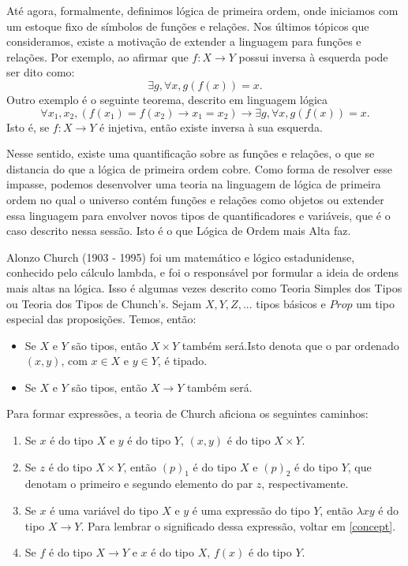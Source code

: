 Até agora, formalmente, definimos lógica de primeira ordem, onde iniciamos com
um estoque fixo de símbolos de funções e relações. Nos últimos tópicos que
consideramos, existe a motivação de extender a linguagem para funções e
relações. Por exemplo, ao afirmar que $f: X \to Y$ possui inversa à esquerda
pode ser dito como: $$\exists g, \forall x, g(f(x)) = x.$$ Outro exemplo é o
seguinte teorema, descrito em linguagem lógica 
$$\forall x_1, x_2, (f(x_1) = f(x_2) \to x_1 = x_2) \to \exists g, \forall x,
g(f(x)) = x.$$ Isto é, se $f: X \to Y$ é injetiva, então existe inversa à sua
esquerda.

Nesse sentido, existe uma quantificação sobre as funções e relações, o que se
distancia do que a lógica de primeira ordem cobre. Como forma de resolver esse
impasse, podemos desenvolver uma teoria na linguagem de lógica de primeira
ordem no qual o universo contém funções e relações como objetos ou extender
essa linguagem para envolver novos tipos de quantificadores e variáveis, que é
o caso descrito nessa sessão. Isto é o que Lógica de Ordem mais Alta faz. 

Alonzo Church (1903 - 1995) foi um matemático e lógico estadunidense,
conhecido pelo cálculo lambda, e foi o responsável por formular a ideia de
ordens  mais altas na lógica. Isso é algumas vezes descrito como Teoria
Simples dos Tipos ou Teoria dos Tipos de Chunch's. Sejam $X, Y, Z,...$ tipos
básicos e $Prop$ um tipo especial das proposições. Temos, então:
\begin{itemize}
    \item Se $X$ e $Y$ são tipos, então $X \times Y$ também será.Isto denota
    que o par ordenado $(x,y)$, com $x \in X$ e $y \in Y$, é tipado. 
    \item Se $X$ e $Y$ são tipos, então $X \to Y$ também será.
\end{itemize}

Para formar expressões, a teoria de Church aficiona os seguintes caminhos: 
\begin{enumerate}
    \item Se $x$ é do tipo $X$ e $y$ é do tipo $Y$, $(x,y)$ é do tipo $X
    \times Y$. 
    \item Se $z$ é do tipo $X \times Y$, então $(p)_1$ é do tipo $X$ e $(p)_2$
    é do tipo $Y$, que denotam o primeiro e segundo elemento do par $z$,
    respectivamente. 
    \item Se $x$ é uma variável do tipo $X$ e $y$ é uma expressão do tipo $Y$,
    então $\lambda x y$ é do tipo $X \to Y$. Para lembrar o significado dessa
    expressão, voltar em \ref{concept}.
    \item Se $f$ é do tipo $X \to Y$ e $x$ é do tipo $X$, $f(x)$ é do tipo
    $Y$. 
\end{enumerate}

